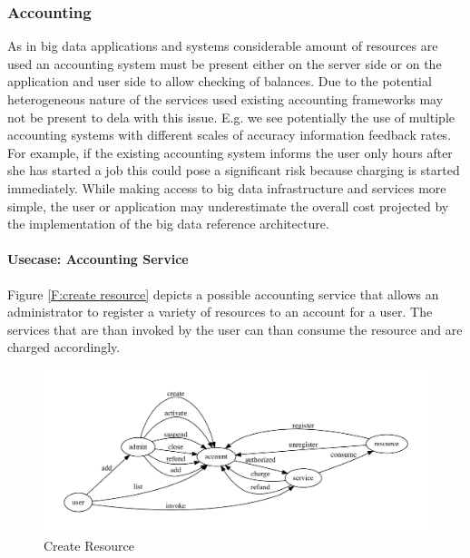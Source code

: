 \documentclass[10pt]{article}
\begin{document}

 
\subsubsection{Accounting}


As in big data applications and systems considerable amount of
resources are used an accounting system must be present either on the
server side or on the application and user side to allow checking of
balances. Due to the potential heterogeneous nature of the services
used existing accounting frameworks may not be present to dela with
this issue. E.g. we see potentially the use of multiple accounting
systems with different scales of accuracy information feedback
rates. For example, if the existing accounting system informs the user
only hours after she has started a job this could pose a significant
risk because charging is started immediately. While making access to
big data infrastructure and services more simple, the user or
application may underestimate the overall cost projected by the
implementation of the big data reference architecture.



\paragraph{Usecase: Accounting Service}

Figure \ref{F:create resource} depicts a possible accounting service
that allows an administrator to register a variety of resources to an
account for a user. The services that are than invoked by the user can
than consume the resource and are charged accordingly.

\begin{figure}[!h]
\includegraphics[height=\textheight]{images/dot/account.pdf}
\caption{Create Resource}\label{F:createresource}
\end{figure}
\end{document}
